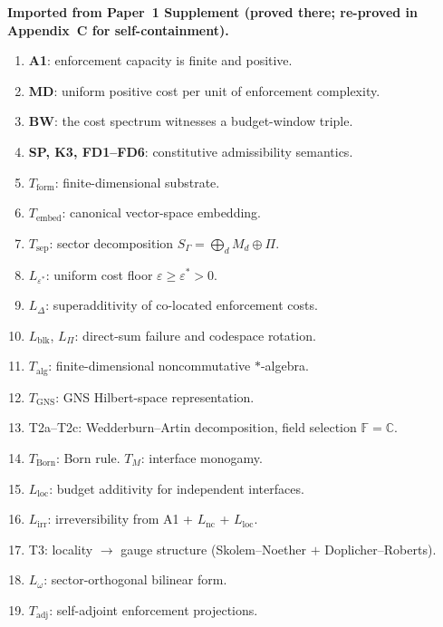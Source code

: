 \documentclass[11pt,a4paper]{article}
\theoremstyle{definition}
\newcommand{\eps}{\varepsilon}
\begin{document}

\medskip
\begin{tcolorbox}[apfbox, title={What Is Assumed, What Is Proved, What Is Deferred}]

\textbf{Imported from Paper~1 Supplement (proved there; re-proved in Appendix~C for self-containment).}
\begin{enumerate}[nosep,label=\arabic*.,leftmargin=2em]
  \item \textbf{A1}: enforcement capacity is finite and positive.
  \item \textbf{MD}: uniform positive cost per unit of enforcement complexity.
  \item \textbf{BW}: the cost spectrum witnesses a budget-window triple.
  \item \textbf{SP, K3, FD1--FD6}: constitutive admissibility semantics.
  \item $T_{\mathrm{form}}$: finite-dimensional substrate.
  \item $T_{\mathrm{embed}}$: canonical vector-space embedding.
  \item $T_{\mathrm{sep}}$: sector decomposition $S_\Gamma = \bigoplus_d M_d \oplus \Pi$.
  \item $L_{\eps^*}$: uniform cost floor $\eps \ge \eps^* > 0$.
  \item $L_\Delta$: superadditivity of co-located enforcement costs.
  \item $L_{\mathrm{blk}}$, $L_\Pi$: direct-sum failure and codespace rotation.
  \item $T_{\mathrm{alg}}$: finite-dimensional noncommutative $*$-algebra.
  \item $T_{\mathrm{GNS}}$: GNS Hilbert-space representation.
  \item T2a--T2c: Wedderburn--Artin decomposition, field selection $\mathbb{F} = \mathbb{C}$.
  \item $T_{\mathrm{Born}}$: Born rule.  $T_M$: interface monogamy.
  \item $L_{\mathrm{loc}}$: budget additivity for independent interfaces.
  \item $L_{\mathrm{irr}}$: irreversibility from A1 + $L_{\mathrm{nc}}$ + $L_{\mathrm{loc}}$.
  \item T3: locality $\to$ gauge structure (Skolem--Noether $+$ Doplicher--Roberts).
  \item $L_\omega$: sector-orthogonal bilinear form.
  \item $T_{\mathrm{adj}}$: self-adjoint enforcement projections.
\end{enumerate}


\end{tcolorbox}
\end{document}

